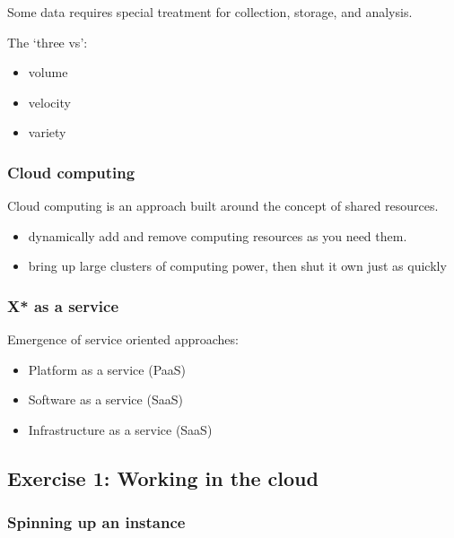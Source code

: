 Some data requires special treatment for collection, storage, and
analysis.

The `three vs':

\begin{itemize}
\itemsep1pt\parskip0pt
\item
  volume
\item
  velocity
\item
  variety
\end{itemize}

\subsubsection{Cloud computing}\label{cloud-computing}

Cloud computing is an approach built around the concept of shared
resources.

\begin{itemize}
\itemsep1pt\parskip0pt
\item
  dynamically add and remove computing resources as you need them.
\item
  bring up large clusters of computing power, then shut it own just as
  quickly
\end{itemize}

\subsubsection{X* as a service}\label{x-as-a-service}

Emergence of service oriented approaches:

\begin{itemize}
\itemsep1pt\parskip0pt
\item
  Platform as a service (PaaS)
\item
  Software as a service (SaaS)
\item
  Infrastructure as a service (SaaS)
\end{itemize}

\subsection{Exercise 1: Working in the
cloud}\label{exercise-1-working-in-the-cloud}

\subsubsection{Spinning up an instance}\label{spinning-up-an-instance}

